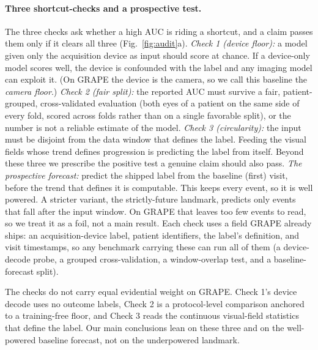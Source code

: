 \paragraph{Three shortcut-checks and a prospective test.} The three checks ask whether a high AUC is riding a shortcut,
and a claim passes them only if it clears all three (Fig.~\ref{fig:audit}a). \emph{Check 1
(device floor):} a model given only the acquisition device as input should score at chance. If a device-only model
scores well, the device is confounded with the label and any imaging model can exploit it. (On GRAPE the device is the
camera, so we call this baseline the \emph{camera floor}.) \emph{Check 2 (fair split):} the reported AUC must survive a
fair, patient-grouped, cross-validated evaluation (both eyes of a patient on the same side of every fold, scored across
folds rather than on a single favorable split), or the number is not a reliable estimate of the model. \emph{Check 3 (circularity):} the input must be disjoint from the data window that defines the label. Feeding
the visual fields whose trend defines progression is predicting the label from itself. Beyond these three we prescribe
the positive test a genuine claim should also pass. \emph{The prospective forecast:} predict the shipped label from the
baseline (first) visit, before the trend that defines it is computable. This keeps every event, so it is well powered. A
stricter variant, the strictly-future landmark, predicts only events that fall after the input window. On GRAPE that
leaves too few events to read, so we treat it as a foil, not a main result. Each check uses a field GRAPE already ships:
an acquisition-device label, patient identifiers, the label's definition, and visit timestamps, so any benchmark
carrying these can run all of them (a device-decode probe, a grouped cross-validation, a window-overlap test, and a
baseline-forecast split).

The checks do not carry equal evidential weight on GRAPE. Check 1's device decode uses no outcome labels, Check 2 is a
protocol-level comparison anchored to a training-free floor, and Check 3 reads the continuous visual-field statistics
that define the label. Our main conclusions lean on these three and on the well-powered baseline forecast, not on the
underpowered landmark.

